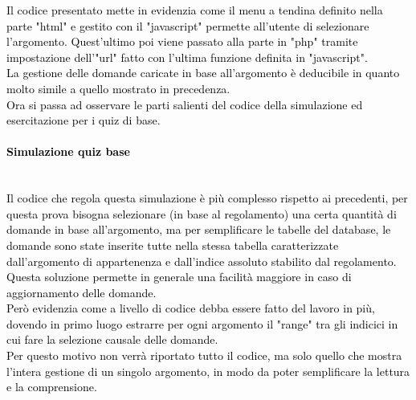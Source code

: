 \textcolor{black}{Il codice presentato mette in evidenzia come il menu a tendina definito nella parte "html" e gestito con il "javascript" permette all'utente di selezionare l'argomento. Quest'ultimo poi viene passato alla parte in "php" tramite impostazione dell'"url" fatto con l'ultima funzione definita in "javascript".\\
La gestione delle domande caricate in base all'argomento è deducibile in quanto molto simile a quello mostrato in precedenza.}\\

\textcolor{black}{Ora si passa ad osservare le parti salienti del codice della simulazione ed esercitazione per i quiz di base.}\\

\paragraph{\textcolor{black}{Simulazione quiz base}}\leavevmode\\
\textcolor{black}{Il codice che regola questa simulazione è più complesso rispetto ai precedenti, per questa prova bisogna selezionare (in base al regolamento) una certa quantità di domande in base all'argomento, ma per semplificare le tabelle del database, le domande sono state inserite tutte nella stessa tabella caratterizzate dall'argomento di appartenenza e dall'indice assoluto stabilito dal regolamento. Questa soluzione permette in generale una facilità maggiore in caso di aggiornamento delle domande.\\
Però evidenzia come a livello di codice debba essere fatto del lavoro in più, dovendo in primo luogo estrarre per ogni argomento il "range" tra gli indicici in cui fare la selezione causale delle domande.\\
Per questo motivo non verrà riportato tutto il codice, ma solo quello che mostra l'intera gestione di un singolo argomento, in modo da poter semplificare la lettura e la comprensione.}\\

